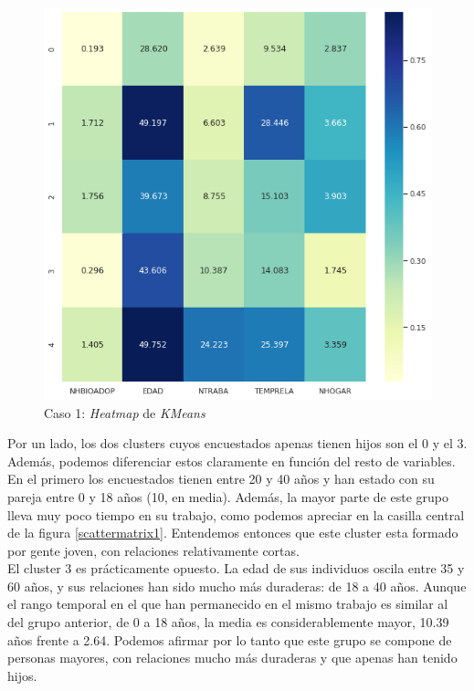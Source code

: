 \documentclass[11pt,a4paper]{article}
\begin{document}
	\begin{figure}[] 
		\centering
		\includegraphics[scale=0.7]{../Caso1/heatmap}
		\caption{Caso 1: \emph{Heatmap} de \emph{KMeans} }
		\label{heatmap1}
	\end{figure}
	
	Por un lado, los dos clusters cuyos encuestados apenas tienen hijos son el 0 y el 3. Además, podemos diferenciar estos claramente en función del resto de variables. En el primero los encuestados tienen entre 20 y 40 años y han estado con su pareja entre 0 y 18 años (10, en media). Además, la mayor parte de este grupo lleva muy poco tiempo en su trabajo, como podemos apreciar en la casilla central de la figura \ref{scattermatrix1}. Entendemos entonces que este cluster esta formado por gente joven, con relaciones relativamente cortas. \\
	
	El cluster 3 es prácticamente opuesto. La edad de sus individuos oscila entre 35 y 60 años, y sus relaciones han sido mucho más duraderas: de 18 a 40 años. Aunque el rango temporal en el que han permanecido en el mismo trabajo es similar al del grupo anterior, de 0 a 18 años, la media es considerablemente mayor, 10.39 años frente a 2.64. Podemos afirmar por lo tanto que este grupo se compone de personas mayores, con relaciones mucho más duraderas y que apenas han tenido hijos. \\
\end{document}
